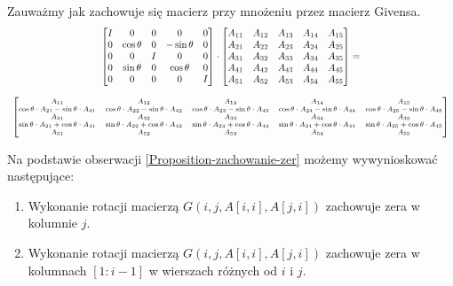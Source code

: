 \documentclass[12pt,a4paper]{report}
\newcommand{\mx}[1]{{#1}}
\begin{document}
\begin{proposition} \label{Proposition-zachowanie-zer}
Zauważmy jak zachowuje się macierz przy mnożeniu przez macierz Givensa.
{
\begin{equation*}
\begin{array}{c}
\begin{bmatrix}
I & 0 & 0 & 0 & 0 \\
0 & \cos\theta & 0 & -\sin\theta & 0 \\
0 & 0 & I & 0 & 0 \\
0 & \sin\theta & 0 & \cos\theta & 0 \\
0 & 0 & 0 & 0 & I
\end{bmatrix} \cdot \begin{bmatrix}
A_{11} & A_{12} & A_{13} & A_{14} & A_{15} \\
A_{21} & A_{22} & A_{23} & A_{24} & A_{25} \\
A_{31} & A_{32} & A_{33} & A_{34} & A_{35} \\
A_{41} & A_{42} & A_{43} & A_{44} & A_{45} \\
A_{51} & A_{52} & A_{53} & A_{54} & A_{55}
\end{bmatrix} = \\ \\
{\scriptsize
\begin{bmatrix}
A_{11} & A_{12} & A_{13} & A_{14} & A_{15} \\
\cos\theta \cdot A_{21} - \sin\theta\cdot A_{41} & \cos\theta \cdot A_{22}- \sin\theta\cdot A_{42} & \cos\theta \cdot A_{23}- \sin\theta\cdot A_{43} & \cos\theta \cdot A_{24}- \sin\theta\cdot A_{44} & \cos\theta \cdot A_{25}- \sin\theta\cdot A_{45} \\
A_{31} & A_{32} & A_{33} & A_{34} & A_{35} \\
\sin\theta\cdot A_{21} + \cos\theta\cdot A_{41} & \sin\theta\cdot A_{22} + \cos\theta\cdot A_{42} & \sin\theta\cdot A_{23} + \cos\theta\cdot A_{43} & \sin\theta\cdot A_{24} + \cos\theta\cdot A_{44} & \sin\theta\cdot A_{25} + \cos\theta\cdot A_{45} \\
A_{51} & A_{52} & A_{53} & A_{54} & A_{55} 
\end{bmatrix}
}
\end{array}
\end{equation*}
}
\end{proposition}

\begin{proposition}\label{Proposition-zera-w-kolumnie}
Na podstawie obserwacji \ref{Proposition-zachowanie-zer} możemy wywynioskować następujące:
\begin{enumerate}
\item Wykonanie rotacji macierzą $\mx{G}(i,j, \mx{A}[i,i], \mx{A}[j,i])$ zachowuje zera w kolumnie $j$.
\item Wykonanie rotacji macierzą $\mx{G}(i,j, \mx{A}[i,i], \mx{A}[j,i])$ zachowuje zera w kolumnach $[1:i-1]$ w wierszach różnych od $i$ i $j$.
\end{enumerate}
\end{proposition}
\end{document}
